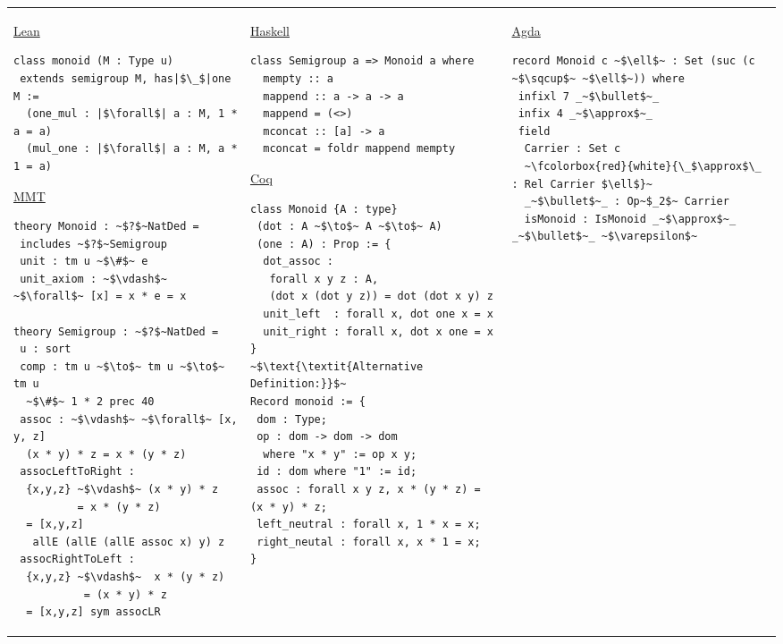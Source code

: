 \footnotesize
\begin{adjustbox}{width=1.2\columnwidth,center}
\begin{tabular}{p{7cm} p{7cm} p{7cm}}  
\underline{Lean}
\begin{verbatim} 
class monoid (M : Type u)
 extends semigroup M, has|$\_$|one M :=
  (one_mul : |$\forall$| a : M, 1 * a = a) 
  (mul_one : |$\forall$| a : M, a * 1 = a)   
\end{verbatim} 
\vspace{0.5cm}
\underline{MMT}
\begin{verbatim}
theory Monoid : ~$?$~NatDed = 
 includes ~$?$~Semigroup 
 unit : tm u ~$\#$~ e 
 unit_axiom : ~$\vdash$~ ~$\forall$~ [x] = x * e = x    
 
theory Semigroup : ~$?$~NatDed = 
 u : sort 
 comp : tm u ~$\to$~ tm u ~$\to$~ tm u 
  ~$\#$~ 1 * 2 prec 40
 assoc : ~$\vdash$~ ~$\forall$~ [x, y, z]
  (x * y) * z = x * (y * z)    
 assocLeftToRight : 
  {x,y,z} ~$\vdash$~ (x * y) * z 
          = x * (y * z) 
  = [x,y,z] 
   allE (allE (allE assoc x) y) z
 assocRightToLeft : 
  {x,y,z} ~$\vdash$~  x * (y * z) 
           = (x * y) * z 
  = [x,y,z] sym assocLR    
\end{verbatim}     
&
\underline{Haskell}
\begin{verbatim}
class Semigroup a => Monoid a where 
  mempty :: a 
  mappend :: a -> a -> a 
  mappend = (<>) 
  mconcat :: [a] -> a 
  mconcat = foldr mappend mempty 
\end{verbatim} 
\vspace{0.5cm}
\underline{Coq}
\begin{verbatim}
class Monoid {A : type}
 (dot : A ~$\to$~ A ~$\to$~ A)
 (one : A) : Prop := {
  dot_assoc : 
   forall x y z : A, 
   (dot x (dot y z)) = dot (dot x y) z
  unit_left  : forall x, dot one x = x 
  unit_right : forall x, dot x one = x              
}
~$\text{\textit{Alternative Definition:}}$~
Record monoid := {
 dom : Type; 
 op : dom -> dom -> dom 
  where "x * y" := op x y; 
 id : dom where "1" := id; 
 assoc : forall x y z, x * (y * z) = (x * y) * z; 
 left_neutral : forall x, 1 * x = x; 
 right_neutal : forall x, x * 1 = x; 
}
\end{verbatim} 
&
\underline{Agda}
\begin{verbatim} 
record Monoid c ~$\ell$~ : Set (suc (c ~$\sqcup$~ ~$\ell$~)) where 
 infixl 7 _~$\bullet$~_
 infix 4 _~$\approx$~_
 field 
  Carrier : Set c 
  ~\fcolorbox{red}{white}{\_$\approx$\_ : Rel Carrier $\ell$}~ 
  _~$\bullet$~_ : Op~$_2$~ Carrier 
  isMonoid : IsMonoid _~$\approx$~_ _~$\bullet$~_ ~$\varepsilon$~ 
  

\end{verbatim}
\end{tabular}
\end{adjustbox}
